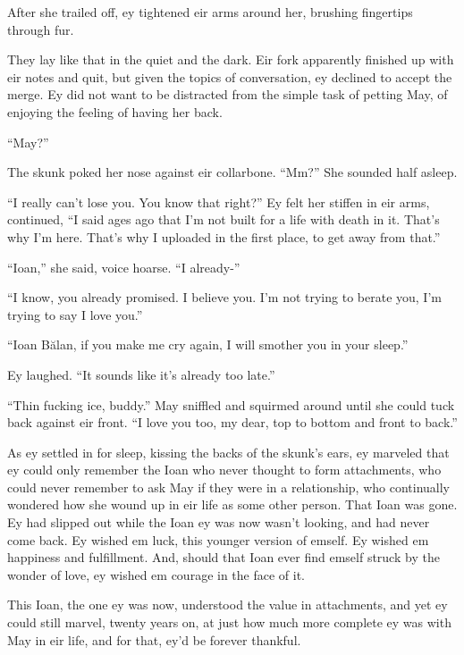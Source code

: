 After she trailed off, ey tightened eir arms around her, brushing fingertips through fur.

They lay like that in the quiet and the dark. Eir fork apparently finished up with eir notes and quit, but given the topics of conversation, ey declined to accept the merge. Ey did not want to be distracted from the simple task of petting May, of enjoying the feeling of having her back.

``May?''

The skunk poked her nose against eir collarbone. ``Mm?'' She sounded half asleep.

``I really can't lose you. You know that right?'' Ey felt her stiffen in eir arms, continued, ``I said ages ago that I'm not built for a life with death in it. That's why I'm here. That's why I uploaded in the first place, to get away from that.''

``Ioan,'' she said, voice hoarse. ``I already-''

``I know, you already promised. I believe you. I'm not trying to berate you, I'm trying to say I love you.''

``Ioan Bălan, if you make me cry again, I will smother you in your sleep.''

Ey laughed. ``It sounds like it's already too late.''

``Thin fucking ice, buddy.'' May sniffled and squirmed around until she could tuck back against eir front. ``I love you too, my dear, top to bottom and front to back.''

As ey settled in for sleep, kissing the backs of the skunk's ears, ey marveled that ey could only remember the Ioan who never thought to form attachments, who could never remember to ask May if they were in a relationship, who continually wondered how she wound up in eir life as some other person. That Ioan was gone. Ey had slipped out while the Ioan ey was now wasn't looking, and had never come back. Ey wished em luck, this younger version of emself. Ey wished em happiness and fulfillment. And, should that Ioan ever find emself struck by the wonder of love, ey wished em courage in the face of it.

This Ioan, the one ey was now, understood the value in attachments, and yet ey could still marvel, twenty years on, at just how much more complete ey was with May in eir life, and for that, ey'd be forever thankful.
